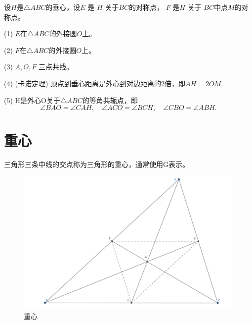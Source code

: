 \begin{theorem}[垂心的对称性质]
    设$H$是$\triangle ABC$的垂心，设$E$ 是 $H$ 关于$BC$的对称点， $F$ 是$H$ 关于 $BC$中点$M$的对称点。

    (1) $E$在$\triangle ABC$的外接圆$O$上。


    (2) $F$在$\triangle ABC$的外接圆$O$上。

    (3) $A, O, F$ 三点共线。

    (4) (卡诺定理) 顶点到垂心距离是外心到对边距离的2倍，即$AH = 2OM.$
   
    (5) H是外心O关于$\triangle ABC$的等角共轭点，即
    $$\angle BAO = \angle CAH, \quad 
    \angle ACO = \angle BCH, \quad 
    \angle CBO = \angle ABH.$$
\end{theorem}



\newpage
\section{重心}
\begin{definition}[重心]
    三角形三条中线的交点称为三角形的重心，通常使用G表示。
\end{definition}

\begin{figure}[H]
    \centering
    \includegraphics[width=0.8\linewidth]{figures/重心.png}
    \caption{重心}
\end{figure}

